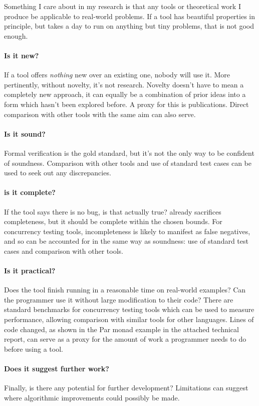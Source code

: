 Something I care about in my research is that any tools or theoretical
work I produce be applicable to real-world problems. If a tool has
beautiful properties in principle, but takes a day to run on anything
but tiny problems, that is not good enough.

\paragraph{Is it new?}

If a tool offers \emph{nothing} new over an existing one, nobody will
use it. More pertinently, without novelty, it's not research. Novelty
doesn't have to mean a completely new approach, it can equally be a
combination of prior ideas into a form which hasn't been explored
before. A proxy for this is publications. Direct comparison with other
tools with the same aim can also serve.

\paragraph{Is it sound?}

Formal verification is the gold standard, but it's not the only way to
be confident of soundness. Comparison with other tools and use of
standard test cases can be used to seek out any discrepancies.

\paragraph{is it complete?}

If the tool says there is no bug, is that actually true? \dejafu{}
already sacrifices completeness, but it should be complete within the
chosen bounds. For concurrency testing tools, incompleteness is likely
to manifest as false negatives, and so can be accounted for in the
same way as soundness: use of standard test cases and comparison with
other tools.

\paragraph{Is it practical?}

Does the tool finish running in a reasonable time on real-world
examples? Can the programmer use it without large modification to
their code? There are standard benchmarks for concurrency testing
tools which can be used to measure performance, allowing comparison
with similar tools for other languages. Lines of code changed, as
shown in the Par monad example in the attached technical report, can
serve as a proxy for the amount of work a programmer needs to do
before using a tool.

\paragraph{Does it suggest further work?}

Finally, is there any potential for further development? Limitations
can suggest where algorithmic improvements could possibly be made.
